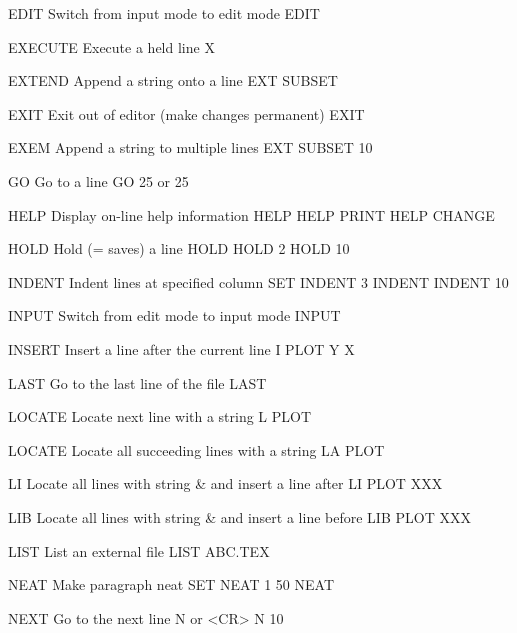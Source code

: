 EDIT      Switch from input mode to edit mode         EDIT
 
EXECUTE   Execute a held line                         X
 
EXTEND    Append a string onto a line                 EXT  SUBSET
 
EXIT      Exit out of editor (make changes permanent) EXIT
 
EXEM      Append a string to multiple lines           EXT  SUBSET 10
 
GO        Go to a line                                GO 25
                                                      or 25
 
HELP      Display on-line help information            HELP
                                                      HELP PRINT
                                                      HELP CHANGE
 
HOLD      Hold (= saves) a line                       HOLD
                                                      HOLD 2
                                                      HOLD 10
 
INDENT    Indent lines at specified column            SET INDENT 3
                                                      INDENT
                                                      INDENT 10
 
INPUT     Switch from edit mode to input mode         INPUT
 
INSERT    Insert a line after the current line        I PLOT Y X
 
LAST      Go to the last line of the file             LAST
 
LOCATE    Locate next line with a string              L PLOT
 
LOCATE    Locate all succeeding lines with a string   LA PLOT
 
LI        Locate all lines with string & and
          insert a line after                         LI PLOT XXX
 
LIB       Locate all lines with string & and
          insert a line before                        LIB PLOT XXX
 
 
LIST      List an external file                       LIST ABC.TEX
 
NEAT      Make paragraph neat                         SET NEAT 1 50
                                                      NEAT
 
NEXT      Go to the next line                         N
                                                      or <CR>
                                                      N 10
 
